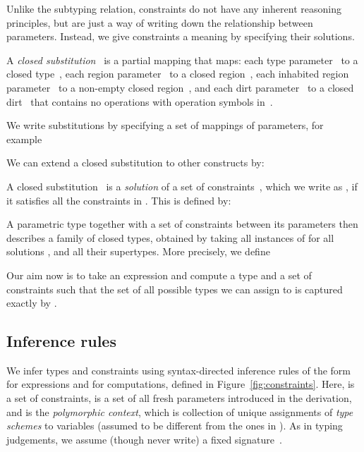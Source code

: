 \documentclass{LMCS}
\begin{document}
Unlike the subtyping relation, constraints do not have any inherent reasoning principles,
but are just a way of writing down the relationship between parameters.
Instead, we give constraints a meaning by specifying their solutions.

\begin{defi}
\label{defi:closed-substitution}
A \emph{closed substitution}~ is a partial mapping that maps:
  each type parameter~ to a closed type~,
  each region parameter~ to a closed region~,
  each inhabited region parameter~ to a non-empty closed region~,
  and each dirt parameter~ to a closed dirt~
  that contains no operations with operation symbols in~.
\end{defi}

We write substitutions by specifying a set of mappings of parameters, for example

We can extend a closed substitution to other constructs by:


\begin{defi}
A closed substitution~ is a \emph{solution} of a set of constraints~,
which we write as ,
if it satisfies all the constraints in .
This is defined by:

\end{defi}

A parametric type  together with a set of constraints  between its parameters
then describes a family of closed types, obtained by taking all instances  of 
for all solutions ,
and all their supertypes.
More precisely, we define

Our aim now is to take an expression 
and compute a type  and a set of constraints 
such that the set of all possible types  we can assign to  is captured exactly by .

\subsection{Inference rules}
\label{sub:inference-rules}

We infer types and constraints using syntax-directed inference rules of the form
 for expressions and
 for computations,
defined in Figure~\ref{fig:constraints}.
Here,  is a set of constraints,
 is a set of all fresh parameters introduced in the derivation,
and  is the \emph{polymorphic context}, which is collection
of unique assignments  of
\emph{type schemes} to variables (assumed to be different from the ones in ).
As in typing judgements, we assume (though never write) a fixed signature~.
\end{document}
